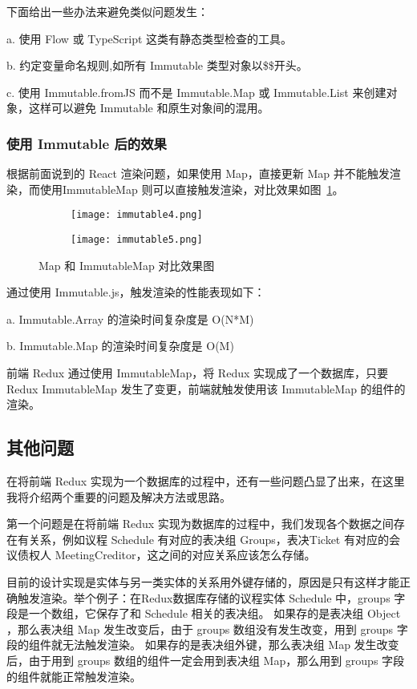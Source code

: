     下面给出一些办法来避免类似问题发生：

    \quad{}a. 使用 Flow 或 TypeScript 这类有静态类型检查的工具。


  \quad{}b. 约定变量命名规则,如所有 Immutable 类型对象以\$\$开头。


  \quad{}c. 使用 Immutable.fromJS 而不是 Immutable.Map 或 Immutable.List 来创建对象，这样可以避免 Immutable 和原生对象间的混用。

  \subsubsection{使用 Immutable 后的效果}
  根据前面说到的 React 渲染问题，如果使用 Map，直接更新 Map 并不能触发渲染，而使用ImmutableMap 则可以直接触发渲染，对比效果如图~\ref{fig:immutable2}。
  \begin{figure}[!htp]
    \centering
    \begin{subfigure}{1\textwidth}
      \centering
      \texttt{[image: immutable4.png]}
      \caption{}
    \end{subfigure}
    \hspace{1cm}
    \begin{subfigure}{1\textwidth}
      \centering
      \texttt{[image: immutable5.png]}
      \caption{}
    \end{subfigure}
    \caption{Map 和 ImmutableMap 对比效果图}
    \label{fig:immutable2}
  \end{figure}
  通过使用 Immutable.js，触发渲染的性能表现如下：

  \quad{}a. Immutable.Array 的渲染时间复杂度是 O(N*M)

  \quad{}b. Immutable.Map 的渲染时间复杂度是 O(M)

  前端 Redux 通过使用 ImmutableMap，将 Redux 实现成了一个数据库，只要 Redux ImmutableMap 发生了变更，前端就触发使用该 ImmutableMap 的组件的渲染。

  \subsection{其他问题}
  在将前端 Redux 实现为一个数据库的过程中，还有一些问题凸显了出来，在这里我将介绍两个重要的问题及解决方法或思路。

  第一个问题是在将前端 Redux 实现为数据库的过程中，我们发现各个数据之间存在有关系，例如议程 Schedule 有对应的表决组 Groups，表决Ticket 有对应的会议债权人 MeetingCreditor，这之间的对应关系应该怎么存储。

  目前的设计实现是实体与另一类实体的关系用外键存储的，原因是只有这样才能正确触发渲染。举个例子：在Redux数据库存储的议程实体 Schedule 中，groups 字段是一个数组，它保存了和 Schedule 相关的表决组。
  如果存的是表决组 Object ，那么表决组 Map 发生改变后，由于 groups 数组没有发生改变，用到 groups 字段的组件就无法触发渲染。
  如果存的是表决组外键，那么表决组 Map 发生改变后，由于用到 groups 数组的组件一定会用到表决组 Map，那么用到 groups 字段的组件就能正常触发渲染。


